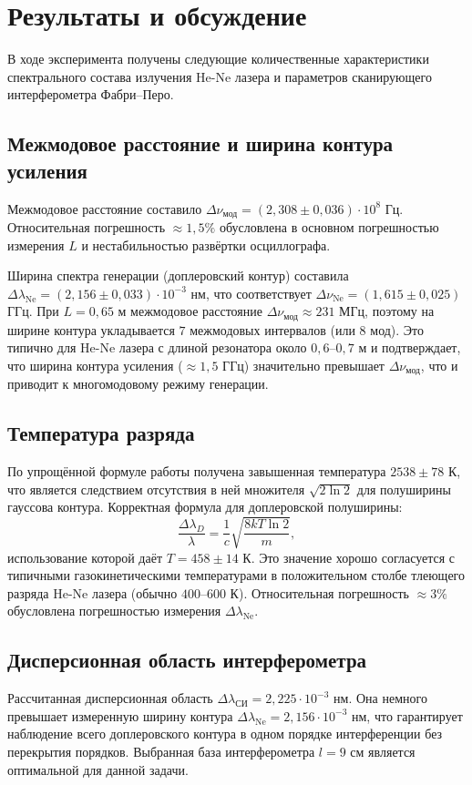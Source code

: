 \documentclass[a4paper]{article}
\begin{document}
\section{Результаты и обсуждение}

В ходе эксперимента получены следующие количественные характеристики спектрального состава излучения He-Ne лазера и параметров сканирующего интерферометра Фабри–Перо.

\subsection{Межмодовое расстояние и ширина контура усиления}
Межмодовое расстояние составило $\Delta\nu_{\text{мод}} = (2,308 \pm 0,036)\cdot10^8$ Гц. Относительная погрешность $\approx 1,5\%$ обусловлена в основном погрешностью измерения $L$ и нестабильностью развёртки осциллографа.

Ширина спектра генерации (доплеровский контур) составила $\Delta\lambda_{\text{Ne}} = (2,156 \pm 0,033)\cdot10^{-3}$ нм, что соответствует $\Delta\nu_{\text{Ne}} = (1,615 \pm 0,025)$ ГГц. При $L = 0,65$ м межмодовое расстояние $\Delta\nu_{\text{мод}} \approx 231$ МГц, поэтому на ширине контура укладывается $7$ межмодовых интервалов (или $8$ мод). Это типично для He-Ne лазера с длиной резонатора около $0,6$–$0,7$ м и подтверждает, что ширина контура усиления ($\approx 1,5$ ГГц) значительно превышает $\Delta\nu_{\text{мод}}$, что и приводит к многомодовому режиму генерации.

\subsection{Температура разряда}
По упрощённой формуле работы получена завышенная температура $2538 \pm 78$ К, что является следствием отсутствия в ней множителя $\sqrt{2\ln 2}$ для полуширины гауссова контура. Корректная формула для доплеровской полуширины:
\[
\frac{\Delta\lambda_D}{\lambda} = \frac{1}{c}\sqrt{\frac{8kT\ln2}{m}},
\]
использование которой даёт $T = 458 \pm 14$ К. Это значение хорошо согласуется с типичными газокинетическими температурами в положительном столбе тлеющего разряда He-Ne лазера (обычно $400$–$600$ К). Относительная погрешность $\approx 3\%$ обусловлена погрешностью измерения $\Delta\lambda_{\text{Ne}}$.

\subsection{Дисперсионная область интерферометра}
Рассчитанная дисперсионная область $\Delta\lambda_{\text{СИ}} = 2,225\cdot10^{-3}$ нм. Она немного превышает измеренную ширину контура $\Delta\lambda_{\text{Ne}} = 2,156\cdot10^{-3}$ нм, что гарантирует наблюдение всего доплеровского контура в одном порядке интерференции без перекрытия порядков. Выбранная база интерферометра $l = 9$ см является оптимальной для данной задачи.
\end{document}
